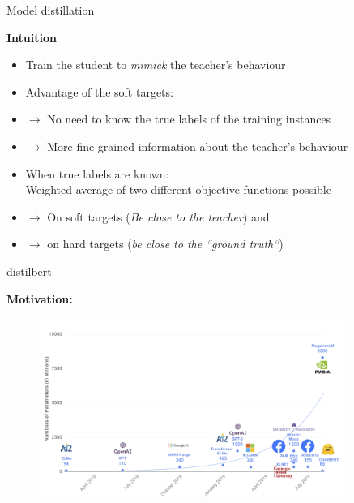
\begin{frame}{Model distillation}

\vfill

\textbf{Intuition}

\begin{itemize}
	\item Train the student to \textit{mimick} the teacher's behaviour
	\item \ques Advantage of the soft targets:
	\item[] $\to$ No need to know the true labels of the training instances
	\item[] $\to$ More fine-grained information about the teacher's behaviour 
	\item When true labels are known:\\
				Weighted average of two different objective functions possible\\
	\item[] $\to$ On soft targets (\textit{Be close to the teacher}) and 
	\item[] $\to$ on hard targets (\textit{be close to the ``ground truth``})
\end{itemize}

\vfill

\end{frame}


\begin{frame}{distilbert}

\textbf{Motivation:}
	\begin{figure}
		\centering
		\includegraphics[width = 10cm]{figure/53-distilbert-motivation}\\ 
	\end{figure}
	
\end{frame}

